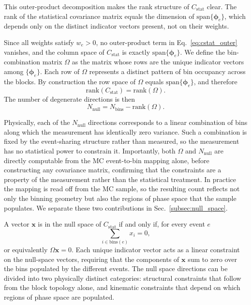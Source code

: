 \documentclass[a4paper,11pt]{article}
\begin{document}
This outer-product decomposition makes the rank structure of $C_{\text{stat}}$ clear. The rank of the statistical covariance matrix equals the dimension of $\mathrm{span}\{\boldsymbol{\phi}_e\}$, which depends only on the distinct indicator vectors present, not on their weights. 


Since all weights satisfy $w_e > 0$, no outer-product term in Eq.~\eqref{eq:cstat_outer} vanishes, and the column space of $C_{\text{stat}}$ is exactly $\mathrm{span}\{\boldsymbol{\phi}_e\}$. We define the bin-combination matrix $\Omega$ as the matrix whose rows are the unique indicator vectors among $\{\boldsymbol{\phi}_e\}$. Each row of $\Omega$ represents a distinct pattern of bin occupancy across the blocks. By construction the row space of $\Omega$ equals $\mathrm{span}\{\boldsymbol{\phi}_e\}$, and therefore
\begin{equation}\label{eq:rank_formula}
    \mathrm{rank} (C_{\text{stat}}) = \mathrm{rank} (\Omega).
\end{equation}
The number of degenerate directions is then
\begin{equation}\label{eq:nnull}
    N_{\text{null}} = N_{\text{bins}} - \mathrm{rank} (\Omega).
\end{equation}

Physically, each of the $N_{\text{null}}$ directions corresponds to a linear combination of bins along which the measurement has identically zero variance. Such a combination is fixed by the event-sharing structure rather than measured, so the measurement has no statistical power to constrain it. Importantly, both $\Omega$ and $N_{\text{null}}$ are directly computable from the MC event-to-bin mapping alone, before constructing any covariance matrix, confirming that the constraints are a property of the measurement rather than the statistical treatment. In practice the mapping is read off from the MC sample, so the resulting count reflects not only the binning geometry but also the regions of phase space that the sample populates. We separate these two contributions in Sec.~\ref{subsec:null_space}.

A vector $\mathbf{x}$ is in the null space of $C_{\text{stat}}$ if and only if, for every event $e$
\begin{equation}\label{eq:null_condition}
    \sum_{i \in \text{bins}(e)} x_{i} = 0,
\end{equation}
or equivalently $\Omega \mathbf{x} = 0$. Each unique indicator vector acts as a linear constraint on the null-space vectors, requiring that the components of $\mathbf{x}$ sum to zero over the bins populated by the different events. The null space directions can be divided into two physically distinct categories: structural constraints that follow from the block topology alone, and kinematic constraints that depend on which regions of phase space are populated.
\end{document}
